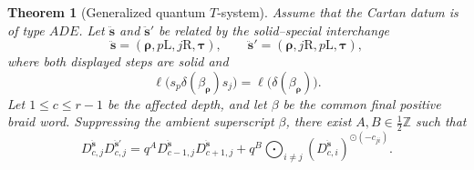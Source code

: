 \documentclass[12pt, reqno]{amsart}
\theoremstyle{plain}
\newtheorem{theorem}{Theorem}[section]
\theoremstyle{definition}
\numberwithin{equation}{section}
\newcommand{\ZZ}{\mathbb{Z}}
\begin{document}
\begin{theorem}[Generalized quantum \(T\)-system]
\label{thm:generalized-T-system}
Assume that the Cartan datum is of type \(ADE\). Let
\(\ddot{\mathbf s}\) and \(\ddot{\mathbf s}'\) be related by the
solid--special interchange
\[
    \ddot{\mathbf s}
    =(\boldsymbol\rho,p\mathrm L,j\mathrm R,\boldsymbol\tau),
    \qquad
    \ddot{\mathbf s}'
    =(\boldsymbol\rho,j\mathrm R,p\mathrm L,\boldsymbol\tau),
\]
where both displayed steps are solid and
\[
    \ell\bigl(s_p\delta(\beta_{\boldsymbol\rho})s_j\bigr)
    =\ell\bigl(\delta(\beta_{\boldsymbol\rho})\bigr).
\]
Let \(1\leq c\leq r-1\) be the affected depth, and let \(\beta\)
be the common final positive braid word. Suppressing the ambient
superscript \(\beta\), there exist \(A,B\in\frac12\ZZ\) such that
\begin{equation}\label{eq:generalized-T-system}
    D_{c,j}^{\ddot{\mathbf s}}D_{c,j}^{\ddot{\mathbf s}'}
    =q^A
      D_{c-1,j}^{\ddot{\mathbf s}}
      D_{c+1,j}^{\ddot{\mathbf s}}
     +q^B
      \bigodot_{i\neq j}
      \left(D_{c,i}^{\ddot{\mathbf s}}\right)^{\odot(-c_{ji})}.
\end{equation}
\end{theorem}
\end{document}
